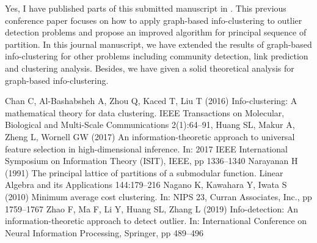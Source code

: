 \documentclass{article}
\begin{document}
\begin{enumerate}
Yes, I have published parts of this submitted manuscript in \cite{zhao2019info}.
This previous conference paper focuses on how to apply graph-based info-clustering to outlier detection problems and propose an improved algorithm for principal
sequence of partition. In this journal manuscript, we have extended the results of graph-based info-clustering for other problems including community
detection, link prediction and clustering analysis. Besides, we have given a solid theoretical analysis for graph-based info-clustering.
\end{enumerate}

\begin{thebibliography}{9}
	 Chan C, Al-Bashabsheh A, Zhou Q, Kaced T, Liu T (2016) Info-clustering: A
	mathematical theory for data clustering. IEEE Transactions on Molecular,
	Biological and Multi-Scale Communications 2(1):64--91,
Huang SL, Makur A, Zheng L, Wornell GW (2017) An information-theoretic approach
to universal feature selection in high-dimensional inference. In: 2017 IEEE
International Symposium on Information Theory (ISIT), IEEE, pp 1336--1340	
	Narayanan H (1991) The principal lattice of partitions of a submodular
	function. Linear Algebra and its Applications 144:179--216
	Nagano K, Kawahara Y, Iwata S (2010) Minimum average cost clustering. In: NIPS
	23, Curran Associates, Inc., pp 1759--1767
	Zhao F, Ma F, Li Y, Huang SL, Zhang L (2019) Info-detection: An
	information-theoretic approach to detect outlier. In: International
	Conference on Neural Information Processing, Springer, pp 489--496
	
\end{thebibliography}
\end{document}
